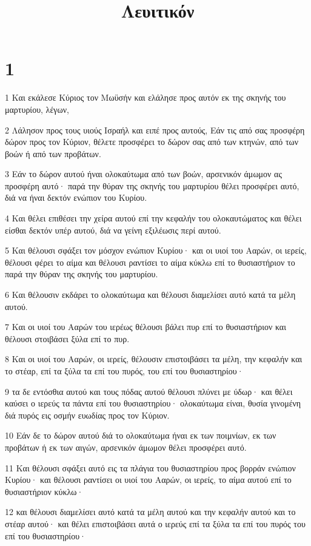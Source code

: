 

\title{Λευιτικόν}


\chapter{1}

\par 1 Και εκάλεσε Κύριος τον Μωϋσήν και ελάλησε προς αυτόν εκ της σκηνής του μαρτυρίου, λέγων,
\par 2 Λάλησον προς τους υιούς Ισραήλ και ειπέ προς αυτούς, Εάν τις από σας προσφέρη δώρον προς τον Κύριον, θέλετε προσφέρει το δώρον σας από των κτηνών, από των βοών ή από των προβάτων.
\par 3 Εάν το δώρον αυτού ήναι ολοκαύτωμα από των βοών, αρσενικόν άμωμον ας προσφέρη αυτό· παρά την θύραν της σκηνής του μαρτυρίου θέλει προσφέρει αυτό, διά να ήναι δεκτόν ενώπιον του Κυρίου.
\par 4 Και θέλει επιθέσει την χείρα αυτού επί την κεφαλήν του ολοκαυτώματος και θέλει είσθαι δεκτόν υπέρ αυτού, διά να γείνη εξιλέωσις περί αυτού.
\par 5 Και θέλουσι σφάξει τον μόσχον ενώπιον Κυρίου· και οι υιοί του Ααρών, οι ιερείς, θέλουσι φέρει το αίμα και θέλουσι ραντίσει το αίμα κύκλω επί το θυσιαστήριον το παρά την θύραν της σκηνής του μαρτυρίου.
\par 6 Και θέλουσιν εκδάρει το ολοκαύτωμα και θέλουσι διαμελίσει αυτό κατά τα μέλη αυτού.
\par 7 Και οι υιοί του Ααρών του ιερέως θέλουσι βάλει πυρ επί το θυσιαστήριον και θέλουσι στοιβάσει ξύλα επί το πυρ.
\par 8 Και οι υιοί του Ααρών, οι ιερείς, θέλουσιν επιστοιβάσει τα μέλη, την κεφαλήν και το στέαρ, επί τα ξύλα τα επί του πυρός, του επί του θυσιαστηρίου·
\par 9 τα δε εντόσθια αυτού και τους πόδας αυτού θέλουσι πλύνει με ύδωρ· και θέλει καύσει ο ιερεύς τα πάντα επί του θυσιαστηρίου· ολοκαύτωμα είναι, θυσία γινομένη διά πυρός εις οσμήν ευωδίας προς τον Κύριον.
\par 10 Εάν δε το δώρον αυτού διά το ολοκαύτωμα ήναι εκ των ποιμνίων, εκ των προβάτων ή εκ των αιγών, αρσενικόν άμωμον θέλει προσφέρει αυτό.
\par 11 Και θέλουσι σφάξει αυτό εις τα πλάγια του θυσιαστηρίου προς βορράν ενώπιον Κυρίου· και θέλουσι ραντίσει οι υιοί του Ααρών, οι ιερείς, το αίμα αυτού επί το θυσιαστήριον κύκλω·
\par 12 και θέλουσι διαμελίσει αυτό κατά τα μέλη αυτού και την κεφαλήν αυτού και το στέαρ αυτού· και θέλει επιστοιβάσει αυτά ο ιερεύς επί τα ξύλα τα επί του πυρός του επί του θυσιαστηρίου·
